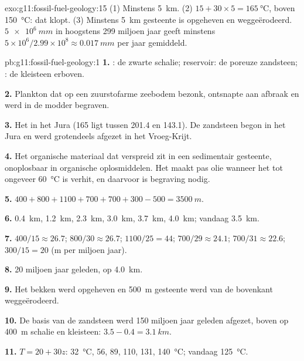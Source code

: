 \begin{solution}{exo:g11:fossil-fuel-geology:15}
(1) Minstens \qty{5}{km}. (2) $15 + 30 \times 5 = \qty{165}{\degreeCelsius}$,
boven \qty{150}{\degreeCelsius}: dat klopt. (3) Minstens \qty{5}{km}
gesteente is opgeheven en weggeërodeerd. $\qty{5e6}{mm}$ in hoogstens
\num{299} miljoen jaar geeft minstens $5 \times 10^6/2.99 \times 10^8
\approx \qty{0.017}{mm}$ per jaar gemiddeld.
\end{solution}

\begin{solution}{pb:g11:fossil-fuel-geology:1}
\textbf{1.} : de zwarte schalie; reservoir: de poreuze zandsteen;
: de kleisteen erboven.

\textbf{2.} Plankton dat op een zuurstofarme zeebodem bezonk, ontsnapte aan
afbraak en werd in de modder begraven.

\textbf{3.} Het  in het Jura (165 ligt tussen 201.4 en
143.1). De zandsteen begon in het Jura en werd grotendeels afgezet in het
Vroeg-Krijt.

\textbf{4.} Het organische materiaal dat verspreid zit in een sedimentair gesteente, onoplosbaar in
organische oplosmiddelen. Het maakt pas olie wanneer het tot ongeveer
\qty{60}{\degreeCelsius} is verhit, en daarvoor is begraving nodig.

\textbf{5.} $400 + 800 + 1100 + 700 + 700 + 300 - 500 = \qty{3500}{m}$.

\textbf{6.} \qty{0.4}{km}, \qty{1.2}{km}, \qty{2.3}{km}, \qty{3.0}{km},
\qty{3.7}{km}, \qty{4.0}{km}; vandaag \qty{3.5}{km}.

\textbf{7.} $400/15 \approx 26.7$; $800/30 \approx 26.7$; $1100/25 = 44$;
$700/29 \approx 24.1$; $700/31 \approx 22.6$; $300/15 = 20$ (\unit{m} per
miljoen jaar).

\textbf{8.} 20 miljoen jaar geleden, op \qty{4.0}{km}.

\textbf{9.} Het bekken werd opgeheven en \qty{500}{m} gesteente werd van de
bovenkant weggeërodeerd.

\textbf{10.} De basis van de zandsteen werd 150 miljoen jaar geleden afgezet, boven
op \qty{400}{m} schalie en kleisteen: $3.5 - 0.4 = \qty{3.1}{km}$.

\textbf{11.} $T = 20 + 30 z$: \qty{32}{\degreeCelsius}, \num{56}, \num{89},
\num{110}, \num{131}, \qty{140}{\degreeCelsius}; vandaag
\qty{125}{\degreeCelsius}.


\end{solution}
